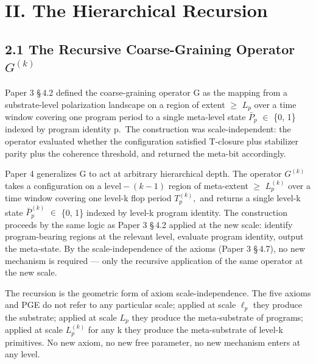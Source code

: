 \documentclass[11pt,oneside]{report}
\theoremstyle{definition}
\theoremstyle{remark}
\begin{document}
\section*{II. The Hierarchical Recursion}

\subsection*{2.1 The Recursive Coarse-Graining Operator \ensuremath{G^{(k)}}}

Paper 3 \S\,4.2 defined the coarse-graining operator G as the mapping from
a substrate-level polarization landscape on a region of extent \ensuremath{\geq} \ensuremath{L_{p}}
over a time window covering one program period to a single meta-level
state \ensuremath{\bar{P}_{p}} \ensuremath{\in} \{0, 1\} indexed by program identity p.~The construction
was scale-independent: the operator evaluated whether the configuration
satisfied T-closure plus stabilizer parity plus the coherence threshold,
and returned the meta-bit accordingly.

Paper 4 generalizes G to act at arbitrary hierarchical depth. The
operator \ensuremath{G^{(k)}} takes a configuration on a \ensuremath{\text{level}-(k-1)} region of
meta-extent \ensuremath{\geq} \ensuremath{L_{p}^{(k)}} over a time window covering one level-k flop
period \ensuremath{T_{p}^{(k)},} and returns a single level-k state \ensuremath{\bar{P}_{p}^{(k)}} \ensuremath{\in}
\{0, 1\} indexed by level-k program identity. The construction proceeds
by the same logic as Paper 3 \S\,4.2 applied at the new scale: identify
program-bearing regions at the relevant level, evaluate program
identity, output the meta-state. By the scale-independence of the axioms
(Paper 3 \S\,4.7), no new mechanism is required --- only the recursive
application of the same operator at the new scale.

The recursion is the geometric form of axiom scale-independence. The
five axioms and PGE do not refer to any particular scale; applied at
scale \ensuremath{\ell_{p}} they produce the substrate; applied at scale \ensuremath{L_{p}} they produce
the meta-substrate of programs; applied at scale \ensuremath{L_{p}^{(k)}} for any k
they produce the meta-substrate of level-k primitives. No new axiom, no
new free parameter, no new mechanism enters at any level.
\end{document}
